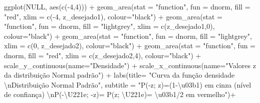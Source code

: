 \documentclass[
]{book}
\newenvironment{Shaded}{\begin{snugshade}}{\end{snugshade}}
\newcommand{\AttributeTok}[1]{\textcolor[rgb]{0.77,0.63,0.00}{#1}}
\newcommand{\ConstantTok}[1]{\textcolor[rgb]{0.00,0.00,0.00}{#1}}
\newcommand{\DecValTok}[1]{\textcolor[rgb]{0.00,0.00,0.81}{#1}}
\newcommand{\FunctionTok}[1]{\textcolor[rgb]{0.00,0.00,0.00}{#1}}
\newcommand{\NormalTok}[1]{#1}
\newcommand{\SpecialCharTok}[1]{\textcolor[rgb]{0.00,0.00,0.00}{#1}}
\newcommand{\StringTok}[1]{\textcolor[rgb]{0.31,0.60,0.02}{#1}}
\begin{document}
\begin{Shaded}
\begin{Highlighting}[]
\FunctionTok{ggplot}\NormalTok{(}\ConstantTok{NULL}\NormalTok{, }\FunctionTok{aes}\NormalTok{(}\FunctionTok{c}\NormalTok{(}\SpecialCharTok{{-}}\DecValTok{4}\NormalTok{,}\DecValTok{4}\NormalTok{))) }\SpecialCharTok{+}
  \FunctionTok{geom\_area}\NormalTok{(}\AttributeTok{stat =} \StringTok{"function"}\NormalTok{, }
            \AttributeTok{fun =}\NormalTok{ dnorm, }
            \AttributeTok{fill =} \StringTok{"red"}\NormalTok{, }
            \AttributeTok{xlim =} \FunctionTok{c}\NormalTok{(}\SpecialCharTok{{-}}\DecValTok{4}\NormalTok{, z\_desejado1),}
            \AttributeTok{colour=}\StringTok{"black"}\NormalTok{) }\SpecialCharTok{+}
  \FunctionTok{geom\_area}\NormalTok{(}\AttributeTok{stat =} \StringTok{"function"}\NormalTok{, }
            \AttributeTok{fun =}\NormalTok{ dnorm, }
            \AttributeTok{fill =} \StringTok{"lightgrey"}\NormalTok{, }
            \AttributeTok{xlim =} \FunctionTok{c}\NormalTok{(z\_desejado1,}\DecValTok{0}\NormalTok{),}
            \AttributeTok{colour=}\StringTok{"black"}\NormalTok{) }\SpecialCharTok{+}
  \FunctionTok{geom\_area}\NormalTok{(}\AttributeTok{stat =} \StringTok{"function"}\NormalTok{, }
            \AttributeTok{fun =}\NormalTok{ dnorm, }
            \AttributeTok{fill =} \StringTok{"lightgrey"}\NormalTok{, }
            \AttributeTok{xlim =} \FunctionTok{c}\NormalTok{(}\DecValTok{0}\NormalTok{, z\_desejado2),}
            \AttributeTok{colour=}\StringTok{"black"}\NormalTok{) }\SpecialCharTok{+}
  \FunctionTok{geom\_area}\NormalTok{(}\AttributeTok{stat =} \StringTok{"function"}\NormalTok{, }
            \AttributeTok{fun =}\NormalTok{ dnorm, }
            \AttributeTok{fill =} \StringTok{"red"}\NormalTok{, }
            \AttributeTok{xlim =} \FunctionTok{c}\NormalTok{(z\_desejado2,}\DecValTok{4}\NormalTok{),}
            \AttributeTok{colour=}\StringTok{"black"}\NormalTok{) }\SpecialCharTok{+}
  \FunctionTok{scale\_y\_continuous}\NormalTok{(}\AttributeTok{name=}\StringTok{"Densidade"}\NormalTok{) }\SpecialCharTok{+}
  \FunctionTok{scale\_x\_continuous}\NormalTok{(}\AttributeTok{name=}\StringTok{"Valores \textasciigrave{}\textasciigrave{}z\textquotesingle{}\textquotesingle{} da distribuição Normal padrão"}\NormalTok{)  }\SpecialCharTok{+}
  \FunctionTok{labs}\NormalTok{(}\AttributeTok{title=} 
         \StringTok{"Curva da função densidade }\SpecialCharTok{\textbackslash{}n}\StringTok{Distribuição Normal Padrão"}\NormalTok{, }
       \AttributeTok{subtitle =} \StringTok{"P({-}z; z)=(1{-}\textbackslash{}u03b1) em cinza (nível de confiança) }\SpecialCharTok{\textbackslash{}n}\StringTok{P({-}\textbackslash{}U221e; {-}z)= P(z; \textbackslash{}U221e)= \textbackslash{}u03b1/2 em vermelho"}\NormalTok{)}\SpecialCharTok{+}

\end{Highlighting}
\end{Shaded}
\end{document}
